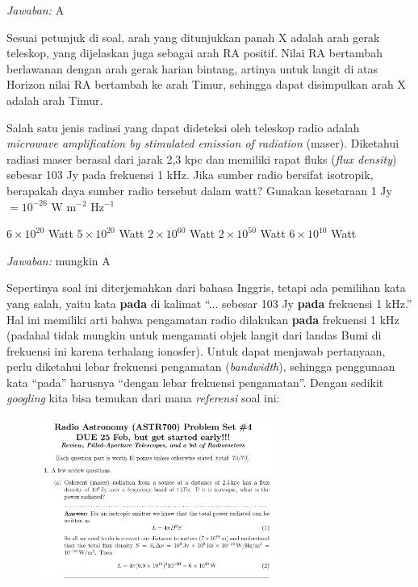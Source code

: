 \documentclass[11pt,fleqn]{exam}
\begin{document}
\begin{questions}
\bigskip
\textit{Jawaban: } A

Sesuai petunjuk di soal, arah yang ditunjukkan panah X adalah arah gerak teleskop, yang dijelaskan juga sebagai arah RA positif. Nilai RA bertambah berlawanan dengan arah gerak harian bintang, artinya untuk langit di atas Horizon nilai RA bertambah ke arah Timur, sehingga dapat disimpulkan arah X adalah arah Timur.

\vspace{0.5cm}
\question Salah satu jenis radiasi yang dapat dideteksi oleh teleskop radio adalah \textit{microwave amplification by stimulated emission of radiation} (maser). Diketahui radiasi maser berasal dari jarak 2,3 kpc dan memiliki rapat fluks (\textit{flux density}) sebesar 103 Jy pada frekuensi 1 kHz. Jika sumber radio bersifat isotropik, berapakah daya sumber radio tersebut dalam watt? Gunakan kesetaraan 1 Jy $= 10^{-26}$ W m$^{-2}$ Hz$^{-1}$
\begin{choices}
\choice $6 \times 10^{20}$ Watt
\choice $5 \times 10^{20}$ Watt
\choice $2 \times 10^{60}$ Watt
\choice $2 \times 10^{50}$ Watt
\choice $6 \times 10^{10}$ Watt
\end{choices}

\bigskip
\textit{Jawaban: } mungkin A

Sepertinya soal ini diterjemahkan dari bahasa Inggris, tetapi ada pemilihan kata yang salah, yaitu kata \textbf{pada} di kalimat ``... sebesar 103 Jy \textbf{pada} frekuensi 1 kHz.'' Hal ini memiliki arti bahwa pengamatan radio dilakukan \textbf{pada} frekuensi 1 kHz (padahal tidak mungkin untuk mengamati objek langit dari landas Bumi di frekuensi ini karena terhalang ionosfer). Untuk dapat menjawab pertanyaan, perlu diketahui lebar frekuensi pengamatan (\textit{bandwidth}), sehingga penggunaan kata ``pada'' harusnya ``dengan lebar frekuensi pengamatan''. Dengan sedikit \textit{googling} kita bisa temukan dari mana \textit{referensi} soal ini:
\begin{figure}[H]
\centering
\includegraphics[width=0.7\textwidth]{soalradio.png}
\label{fig:osp2022_14}
\end{figure}


\end{questions}
\end{document}

